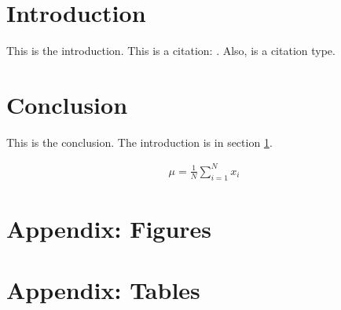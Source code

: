 \onehalfspacing
\newpage
\clearpage
\setcounter{page}{1}


\section{Introduction}
\label{sec:intro}

This is the introduction. This is a citation: \cite{Fehder2014}. Also, \citep{Fehder2014} is a citation type.



\section{Conclusion}
\label{sec:conclusion}

This is the conclusion. The introduction is in section \ref{sec:intro}.

\begin{align}
	\mu = \frac{1}{N} \sum_{i=1}^N x_i
\end{align}


\clearpage





\clearpage

\begin{appendix}
\section{Appendix: Figures}
\setcounter{table}{0}
\renewcommand{\thetable}{A-\arabic{table}}
\setcounter{figure}{0}
\renewcommand{\thefigure}{A-\arabic{figure}}






\clearpage
\section{Appendix: Tables}





\end{appendix}








%
